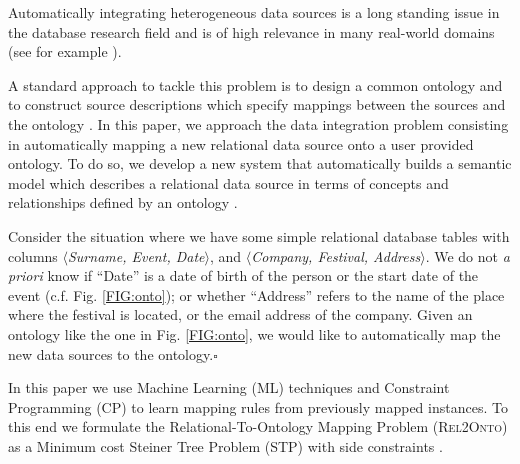 \documentclass[letterpaper]{article} %
\newcommand{\relonto}{\textsc{Rel2Onto}}
\begin{document}
Automatically integrating heterogeneous data sources is a long standing issue in the database research field and is of high relevance in many real-world 
domains (see for example \cite{Rahm:2001:SAA:767149.767154,Dhamankar:imap,Taheriyan2013}).

A standard approach to tackle this problem is to design a common ontology and to construct source descriptions which specify mappings between the sources and the ontology \cite{doan2012principles}.
In this paper, we approach the data integration problem consisting in automatically mapping a new relational data source onto a user provided ontology.
To do so, we develop a new system that automatically builds a semantic model which describes a relational data source in terms of concepts and relationships defined by an ontology \cite{taheriyan2016learning}.


Consider the situation where we have some simple relational database tables with columns $\langle$\textit{Surname, Event, Date}$\rangle$, and 
$\langle$\textit{Company, Festival, Address}$\rangle$.
We do not \textit{a priori} know if ``Date'' is a 
date of birth of the person or the start date of the event (c.f. Fig. \ref{FIG:onto}); or whether 
``Address'' refers to the name of the place where the festival is located, or the 
email address of the company. 
Given an ontology like the one in Fig. \ref{FIG:onto}, we would like to automatically map the new data sources to  the 
ontology.\hfill$\square$

In this paper we use Machine Learning (ML) techniques and Constraint Programming (CP) to learn mapping rules from previously mapped instances.
To this end we formulate the Relational-To-Ontology Mapping Problem (\relonto{}) as a Minimum cost Steiner Tree Problem (STP) with side constraints \cite{deuna2016steiner}.
\end{document}
